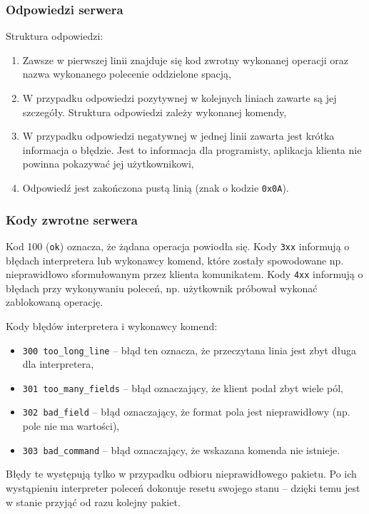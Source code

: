 \documentclass[8pt,a4paper]{article}
\begin{document}
\subsubsection{Odpowiedzi serwera}
\noindent Struktura odpowiedzi:
\begin{enumerate}
    \item Zawsze w pierwszej linii znajduje się kod zwrotny wykonanej operacji oraz nazwa wykonanego polecenie oddzielone spacją,
    \item W przypadku odpowiedzi pozytywnej w kolejnych liniach zawarte są jej szczegóły. Struktura odpowiedzi zależy wykonanej komendy,
    \item W przypadku odpowiedzi negatywnej w jednej linii zawarta jest krótka informacja o błędzie. Jest to informacja dla programisty, aplikacja klienta nie powinna pokazywać jej użytkownikowi,
    \item Odpowiedź jest zakończona pustą linią (znak o kodzie \texttt{0x0A}).
\end{enumerate}

\subsubsection{Kody zwrotne serwera}
\noindent Kod 100 (\texttt{ok}) oznacza, że żądana operacja powiodła się. Kody \texttt{3xx} informują o błędach interpretera lub wykonawcy komend, które zostały spowodowane np. nieprawidłowo sformułowanym przez klienta komunikatem. Kody \texttt{4xx} informują o błędach przy wykonywaniu poleceń, np. użytkownik próbował wykonać zablokowaną operację.

\noindent Kody błędów interpretera i wykonawcy komend:
\begin{itemize}
    \item \texttt{300 too\_long\_line} -- błąd ten oznacza, że przeczytana linia jest zbyt długa dla interpretera,
    \item \texttt{301 too\_many\_fields} -- błąd oznaczający, że klient podał zbyt wiele pól,
    \item \texttt{302 bad\_field} -- błąd oznaczający, że format pola jest nieprawidłowy (np. pole nie ma wartości),
    \item \texttt{303 bad\_command} -- błąd oznaczający, że wskazana komenda nie istnieje.
\end{itemize}
Błędy te występują tylko w przypadku odbioru nieprawidłowego pakietu. Po ich wystąpieniu interpreter poleceń dokonuje resetu swojego stanu -- dzięki temu jest w stanie przyjąć od razu kolejny pakiet.
\end{document}
